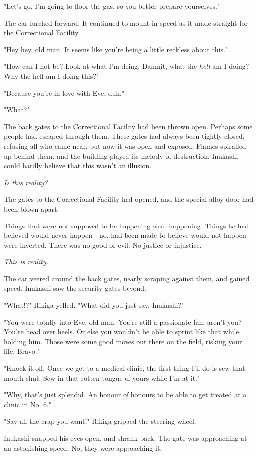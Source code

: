 "Let's go. I'm going to floor the gas, so you better prepare
yourselves."

The car lurched forward. It continued to mount in speed as it made
straight for the Correctional Facility.

"Hey hey, old man. It seems like you're being a little reckless about
this."

"How can I not be? Look at what I'm doing. Damnit, what the \emph{hell} am I
doing? Why the hell am I doing this?"

"Because you're in love with Eve, duh."

"What?"

The back gates to the Correctional Facility had been thrown open.
Perhaps some people had escaped through them. These gates had always
been tightly closed, refusing all who came near, but now it was open and
exposed. Flames spiralled up behind them, and the building played its
melody of destruction. Inukashi could hardly believe that this wasn't an
illusion.

\emph{Is this reality?}

The gates to the Correctional Facility had opened, and the special alloy
door had been blown apart.

Things that were not supposed to be happening were happening. Things he
had believed would never happen---no, had been made to believe would not
happen---were inverted. There was no good or evil. No justice or
injustice.

\emph{This is reality.}

The car veered around the back gates, nearly scraping against them, and
gained speed. Inukashi saw the security gates beyond.

"What!?" Rikiga yelled. "What did you just say, Inukashi?"

"You were totally into Eve, old man. You're still a passionate fan,
aren't you? You're head over heels. Or else you wouldn't be able to
sprint like that while holding him. Those were some good moves out there
on the field, risking your life. Bravo."

"Knock it off. Once we get to a medical clinic, the first thing I'll do
is sew that mouth shut. Sew in that rotten tongue of yours while I'm at
it."

"Why, that's just splendid. An honour of honours to be able to get
treated at a clinic in No. 6."

"Say all the crap you want!" Rikiga gripped the steering wheel.

Inukashi snapped his eyes open, and shrank back. The gate was
approaching at an astonishing speed. No, they were approaching it.

